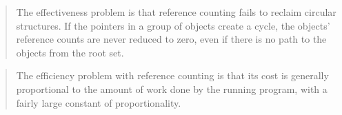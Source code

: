 \documentclass[a4paper,oneside]{memoir}
\begin{document}
\blockquote{The effectiveness problem is that reference counting fails to reclaim
circular structures. If the pointers in a group of objects create a cycle, the
objects' reference counts are never reduced to zero, even if there is no path
to the objects from the root set. \cite{Wilson:1992}}


\blockquote{The efficiency problem with reference counting is that its cost is
generally proportional to the amount of work done by the running program, with a
fairly large constant of proportionality.}
\cite{Wilson:1992}





\end{document}
